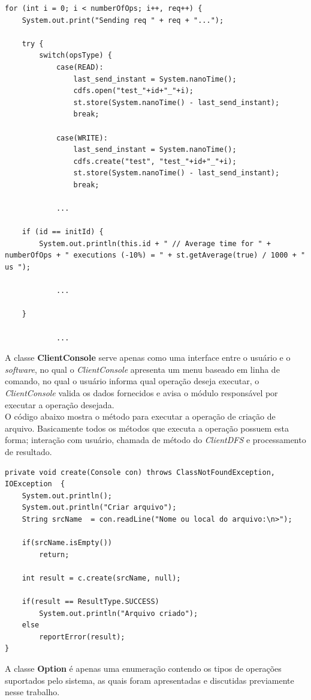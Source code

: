 \begin{lstlisting}[basicstyle=\ttfamily\footnotesize, frame=single]
for (int i = 0; i < numberOfOps; i++, req++) {
	System.out.print("Sending req " + req + "...");
	
	try {
		switch(opsType) {
			case(READ):
				last_send_instant = System.nanoTime();
				cdfs.open("test_"+id+"_"+i);
				st.store(System.nanoTime() - last_send_instant);
				break;
			
			case(WRITE):
				last_send_instant = System.nanoTime();
				cdfs.create("test", "test_"+id+"_"+i);
				st.store(System.nanoTime() - last_send_instant);
				break;
			
			...
			
	if (id == initId) {
		System.out.println(this.id + " // Average time for " + numberOfOps + " executions (-10%) = " + st.getAverage(true) / 1000 + " us ");
		
			...
			
	}	
		
			...
\end{lstlisting}
 


A classe \textbf{ClientConsole} serve apenas como uma interface entre o usuário e o \textit{software}, no qual o \textit{ClientConsole} apresenta um menu baseado em linha de comando, no qual o usuário informa qual operação deseja executar, o \textit{ClientConsole} valida os dados fornecidos e avisa o módulo responsável por executar a operação desejada.
\\

O código abaixo mostra o método para executar a operação de criação de arquivo.
Basicamente todos os métodos que executa a operação possuem esta forma; interação com usuário, chamada de método do \textit{ClientDFS} e processamento de resultado.
\begin{lstlisting}[basicstyle=\ttfamily\footnotesize, frame=single]
private void create(Console con) throws ClassNotFoundException, IOException  {
	System.out.println();
	System.out.println("Criar arquivo");
	String srcName  = con.readLine("Nome ou local do arquivo:\n>");
	
	if(srcName.isEmpty())
		return;
	
	int result = c.create(srcName, null);
	
	if(result == ResultType.SUCCESS)
		System.out.println("Arquivo criado");
	else
		reportError(result);
}
\end{lstlisting}

A classe \textbf{Option} é apenas uma enumeração contendo os tipos de operações suportados pelo sistema, as quais foram apresentadas e discutidas previamente nesse trabalho.
\\

